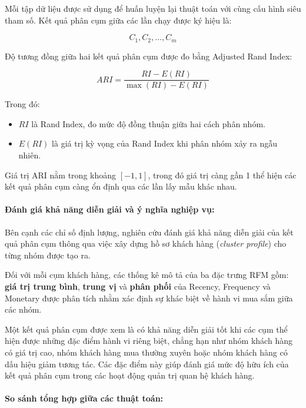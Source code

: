\documentclass[12pt]{ai_conquer2026}
\begin{document}
Mỗi tập dữ liệu được sử dụng để huấn luyện lại thuật toán với cùng cấu hình siêu tham số. Kết quả phân cụm giữa các lần chạy được ký hiệu là:

\begin{equation}
C_1,C_2,...,C_m
\end{equation}

Độ tương đồng giữa hai kết quả phân cụm được đo bằng Adjusted Rand Index:

\begin{equation}
ARI=
\frac{RI-E(RI)}
{\max(RI)-E(RI)}
\end{equation}

Trong đó:

\begin{itemize}
    \item $RI$ là Rand Index, đo mức độ đồng thuận giữa hai cách phân nhóm.
    \item $E(RI)$ là giá trị kỳ vọng của Rand Index khi phân nhóm xảy ra ngẫu nhiên.
\end{itemize}

Giá trị ARI nằm trong khoảng $[-1,1]$, trong đó giá trị càng gần 1 thể hiện các kết quả phân cụm càng ổn định qua các lần lấy mẫu khác nhau.

\paragraph{Đánh giá khả năng diễn giải và ý nghĩa nghiệp vụ:}

Bên cạnh các chỉ số định lượng, nghiên cứu đánh giá khả năng diễn giải của kết quả phân cụm thông qua việc xây dựng hồ sơ khách hàng (\textit{cluster profile}) cho từng nhóm được tạo ra.

Đối với mỗi cụm khách hàng, các thống kê mô tả của ba đặc trưng RFM gồm: \textbf{giá trị trung bình}, \textbf{trung vị} và \textbf{phân phối} của Recency, Frequency và Monetary được phân tích nhằm xác định sự khác biệt về hành vi mua sắm giữa các nhóm.

Một kết quả phân cụm được xem là có khả năng diễn giải tốt khi các cụm thể hiện được những đặc điểm hành vi riêng biệt, chẳng hạn như nhóm khách hàng có giá trị cao, nhóm khách hàng mua thường xuyên hoặc nhóm khách hàng có dấu hiệu giảm tương tác. Các đặc điểm này giúp đánh giá mức độ hữu ích của kết quả phân cụm trong các hoạt động quản trị quan hệ khách hàng.

\paragraph{So sánh tổng hợp giữa các thuật toán:}
\end{document}

